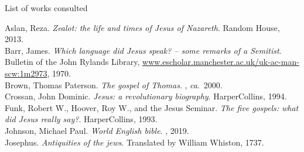 \documentclass[10pt,twoside]{article} %
\begin{document}
\begin{section}{List of works consulted}

\newcommand{\refbook}[4]{#1. \emph{#2}. #3, #4.\\} %

\refbook{Aslan, Reza}{Zealot: the life and times of Jesus of Nazareth}{Random House}{2013}

\refbook{Barr, James}{Which language did Jesus speak? -- some remarks of a Semitist}{Bulletin of the John Rylands Library,
\url{www.escholar.manchester.ac.uk/uk-ac-man-scw:1m2973}}{1970}

\refbook{Brown, Thomas Paterson}{The gospel of Thomas}{}{\emph{ca}.~2000}

\refbook{Crossan, John Dominic}{Jesus: a revolutionary biography}{HarperCollins}{1994}

\refbook{Funk, Robert W., Hoover, Roy W., and the Jesus Seminar}{The five gospels: what did Jesus really say?}{HarperCollins}{1993}

\refbook{Johnson, Michael Paul}{World English bible}{}{2019}

\refbook{Josephus}{Antiquities of the jews}{Translated by William Whiston}{1737}

\end{section}
\end{document}
